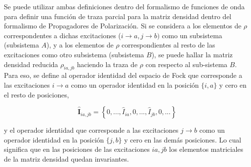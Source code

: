 \documentclass{beamer}
\begin{document}
\begin{frame}

\small
Se puede utilizar ambas definiciones dentro del formalismo de funciones de onda para definir una función de traza parcial 
para la matriz densidad dentro del formalismo de Propagadores de Polarización.
\vfill 
\pause
Si se considera a los elementos de $\rho$ correspondentes a dichas excitaciones ($i\rightarrow a, j \rightarrow b)$ como un subsistema 
(subsistema $A$), 
y a los elementos de $\rho$ correspondientes al resto de las excitaciones como otro subsistema (subsistema $B$), se puede
hallar la matriz densidad reducida $\rho_{ia,jb}$ haciendo la traza de $\rho$ con respecto al sub-sistema $B$. %
\pause
\vfill
Para eso, se define al operador identidad del espacio de 
Fock que corresponde a las excitaciones $i\rightarrow a$ como un operador identidad en la posición $\{ i,a \}$  y 
cero en el resto de posiciones,

\begin{equation*}
  \bm{\hat{I}}_{ia,jb} = \left\{ 0, ..., \hat{I}_{ia}, 0,...,\hat{I}_{jb}, 0, ... \right\}
\end{equation*}

y el operador identidad que corresponde a las excitaciones $j\rightarrow b$ como un operador identidad 
en la posición $\{j,b\}$ y cero en las demás posiciones.
Lo cual significa que en las posiciones de las excitaciones $ia,jb$ los elementos matriciales de la matriz densidad
quedan invariantes.

\end{frame}



\end{document}
